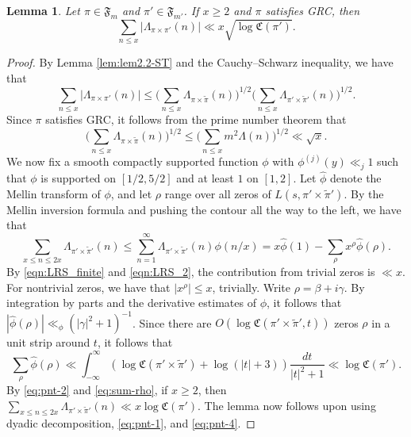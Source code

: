 \documentclass[12pt,reqno]{amsart}
\newtheorem{lem}[thm]{Lemma}
\theoremstyle{remark}
\numberwithin{equation}{section}
\begin{document}
    \begin{lem}\label{lem:pnt}
    Let $\pi \in \mathfrak{F}_m$ and $\pi' \in \mathfrak{F}_{m'}$. If $x\geq 2$ and $\pi$ satisfies GRC, then
        \[
        \sum_{n \le x}|\Lambda_{\pi \times \pi'}(n)| \ll x\sqrt{\log\mathfrak{C}(\pi')}.
        \]
    \end{lem}
    \begin{proof}
        By Lemma \ref{lem:lem2.2-ST} and the Cauchy--Schwarz inequality, we have that
        \begin{equation}\label{eq:pnt-1}
            \sum_{n \le x}|\Lambda_{\pi \times \pi'}(n)| \le \Big(\sum_{n \le x}\Lambda_{\pi \times \widetilde{\pi}}(n)\Big)^{1/2}\Big(\sum_{n \le x}\Lambda_{\pi' \times \widetilde{\pi}'}(n)\Big)^{1/2}.
        \end{equation}
        Since $\pi$ satisfies GRC, it follows from the prime number theorem that 
        \begin{equation}\label{eq:pnt-4}
        \Big(\sum_{n \le x}\Lambda_{\pi \times \widetilde{\pi}}(n)\Big)^{1/2} \le  \Big(\sum_{n \le x}m^2\Lambda(n)\Big)^{1/2} \ll \sqrt{x}. 
        \end{equation}
        We now fix a smooth compactly supported function $\phi$ with $\phi^{(j)}(y) \ll_j 1$ such that $\phi$ is supported on $[1/2,5/2]$ and at least $1$ on $[1,2]$. Let $\widehat{\phi}$ denote the Mellin transform of $\phi$, and let $\rho$ range over all zeros of $L(s, \pi' \times \widetilde{\pi}')$. By the Mellin inversion formula and pushing the contour all the way to the left, we have that
    \begin{equation}\label{eq:pnt-2}
            \sum_{x \le n \le 2x} \Lambda_{\pi' \times \widetilde{\pi}'}(n) \leq  \sum_{n=1}^{\infty} \Lambda_{\pi' \times \widetilde{\pi}'}(n)\phi(n/x) = x\widehat{\phi}(1)  - \sum_{\rho} x^{\rho}\widehat{\phi}(\rho).
        \end{equation}
          By \eqref{eqn:LRS_finite} and \eqref{eqn:LRS_2},  the contribution from trivial zeros is $\ll x$.  For nontrivial zeros, we have that $|x^{\rho}|\leq x$, trivially. Write $\rho = \beta + i \gamma$. By integration by parts and the derivative estimates of $\phi$, it follows that $|\widehat{\phi}(\rho)| \ll_\phi (|\gamma|^2+1)^{-1}$. Since there are $O(\log \mathfrak{C}(\pi' \times \widetilde{\pi}', t))$ zeros $\rho$ in a unit strip around $t$, it follows that
        \begin{equation}\label{eq:sum-rho}
            \sum_{\rho} \widehat{\phi}(\rho) \ll \int_{-\infty}^{\infty} (\log \mathfrak{C}(\pi'\times \widetilde{\pi}') +\log(|t|+3)) \frac{dt}{|t|^2+1}  \ll \log\mathfrak{C}(\pi').
        \end{equation} 
        By \eqref{eq:pnt-2} and \eqref{eq:sum-rho},  if $x\geq 2$, then $\sum_{x \le n \le 2x} \Lambda_{\pi' \times \widetilde{\pi}'}(n) \ll x\log\mathfrak{C}(\pi')$. The lemma now follows upon using dyadic decomposition, \eqref{eq:pnt-1}, and \eqref{eq:pnt-4}.
    \end{proof}
    
\end{document}
